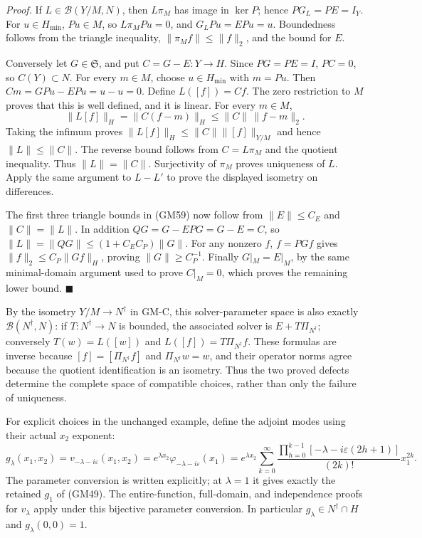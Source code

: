\documentclass[
  11pt,
]{article}
\begin{document}
\emph{Proof.} If \(L\in\mathcal B(Y/M,N)\), then
\(L\pi_M\) has image in \(\ker P\);
hence \(PG_L=PE=I_Y\). For \(u\in H_{\min}\),
\(Pu\in M\), so \(L\pi_M Pu=0\), and
\(G_LPu=EPu=u\). Boundedness follows from the triangle
inequality, \(\|\pi_Mf\|\leq\|f\|_2\), and the bound for
\(E\).

Conversely let \(G\in\mathfrak S\), and put
\(C=G-E:Y\to H\). Since \(PG=PE=I\),
\(PC=0\), so \(C(Y)\subset N\). For every
\(m\in M\), choose \(u\in H_{\min}\) with
\(m=Pu\). Then \(Cm=GPu-EPu=u-u=0\). Define
\(L([f])=Cf\). The zero restriction to
\(M\) proves that this is well defined, and it is
linear. For every \(m\in M\), \[
 \|L[f]\|_H=\|C(f-m)\|_H
                 \leq\|C\|\,\|f-m\|_2.
\]
Taking the infimum proves \(\|L[f]\|_H\leq\|C\|\|[f]\|_{Y/M}\) and hence
\(\|L\|\leq\|C\|\). The reverse bound follows from
\(C=L\pi_M\) and the quotient inequality. Thus
\(\|L\|=\|C\|\). Surjectivity of \(\pi_M\)
proves uniqueness of \(L\). Apply the same argument
to \(L-L'\) to prove the displayed isometry on
differences.

The first three triangle bounds in (GM59) now follow from
\(\|E\|\leq C_E\) and \(\|C\|=\|L\|\). In addition
\(QG=G-EPG=G-E=C\), so \(\|L\|=\|QG\|\leq(1+C_EC_P)\|G\|\). For any
nonzero \(f\), \(f=PGf\) gives
\(\|f\|_2\leq C_P\|Gf\|_H\), proving \(\|G\|\geq C_P^{-1}\). Finally
\(G|_M=E|_M\), by the same minimal-domain argument used to
prove \(C|_M=0\), which proves the remaining lower
bound. \hfill\ensuremath{\blacksquare}

By the isometry \(Y/M\to N^\dagger\) in GM-C, this
solver-parameter space is also exactly \(\mathcal B(N^\dagger,N)\): if
\(T:N^\dagger\to N\) is bounded, the associated solver is
\(E+T\Pi_{N^\dagger}\); conversely \(T(w)=L([w])\) and
\(L([f])=T\Pi_{N^\dagger}f\). These formulas are inverse because
\([f]=[\Pi_{N^\dagger}f]\) and \(\Pi_{N^\dagger}w=w\), and their
operator norms agree because the quotient identification is an isometry.
Thus the two proved defects determine the complete space of compatible
choices, rather than only the failure of uniqueness.

For explicit choices in the unchanged example, define the adjoint modes
using their actual \(x_2\) exponent:
\[
 g_\lambda(x_1,x_2)
     =v_{-\lambda-i\varepsilon}(x_1,x_2)
     =e^{\lambda x_2}\varphi_{-\lambda-i\varepsilon}(x_1)
     =e^{\lambda x_2}\sum_{k=0}^{\infty}
       \frac{\prod_{h=0}^{k-1}[-\lambda-i\varepsilon(2h+1)]}{(2k)!}x_1^{2k}.
 \tag{GM60}
\] The parameter conversion is written
explicitly; at \(\lambda=1\) it gives exactly the retained
\(g_1\) of (GM49). The entire-function, full-domain,
and independence proofs for \(v_\lambda\) apply under this
bijective parameter conversion. In particular \(g_\lambda\in N^\dagger\cap H\)
and \(g_\lambda(0,0)=1\).
\end{document}
